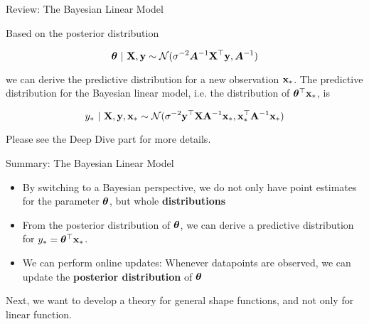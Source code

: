 \documentclass[11pt,compress,t,notes=noshow, xcolor=table]{beamer}
\begin{document}
\begin{vbframe}{Review: The Bayesian Linear Model} 
    
    Based on the posterior distribution 
    
    $$
    \bm{\theta} ~|~ \mathbf{X}, \mathbf{y} \sim \mathcal{N}(\sigma^{-2}\bm{A}^{-1}\mathbf{X}^\top\mathbf{y}, \bm{A}^{-1})
    $$
    
    we can derive the predictive distribution for a new observation $\mathbf{x}_*$. The predictive distribution for the Bayesian linear model, i.e. the distribution of $\bm{\theta}^\top \mathbf{x}_*$, is 
    
    $$
    y_* ~|~ \mathbf{X}, \mathbf{y}, \mathbf{x}_* \sim \mathcal{N}(\sigma^{-2}\mathbf{y}^\top \mathbf{X} \mathbf{A}^{-1}\mathbf{x}_*, \mathbf{x}_*^\top\mathbf{A}^{-1}\mathbf{x}_*)
    $$ 

    Please see the Deep Dive part for more details.
    
\end{vbframe}



\begin{vbframe}{Summary: The Bayesian Linear Model}

\begin{itemize}
  \item By switching to a Bayesian perspective, we do not only have point estimates for the parameter $\bm{\theta}$, but whole \textbf{distributions}
  \item From the posterior distribution of $\bm{\theta}$, we can derive a predictive distribution for $y_* = \bm{\theta}^\top \mathbf{x}_*$.  
  \item We can perform online updates: Whenever datapoints are observed, we can update the \textbf{posterior distribution} of $\bm{\theta}$
\end{itemize}

Next, we want to develop a theory for general shape functions, and not only for linear function. 

\end{vbframe}
\end{document}
